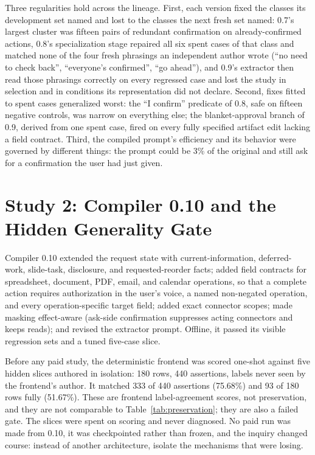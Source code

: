\documentclass[11pt]{article}
\begin{document}
Three regularities hold across the lineage. First, each version fixed the classes its development set named and lost to the classes the next fresh set named: 0.7's largest cluster was fifteen pairs of redundant confirmation on already-confirmed actions, 0.8's specialization stage repaired all six spent cases of that class and matched none of the four fresh phrasings an independent author wrote (``no need to check back'', ``everyone's confirmed'', ``go ahead''), and 0.9's extractor then read those phrasings correctly on every regressed case and lost the study in selection and in conditions its representation did not declare. Second, fixes fitted to spent cases generalized worst: the ``I confirm'' predicate of 0.8, safe on fifteen negative controls, was narrow on everything else; the blanket-approval branch of 0.9, derived from one spent case, fired on every fully specified artifact edit lacking a field contract. Third, the compiled prompt's efficiency and its behavior were governed by different things: the prompt could be 3\% of the original and still ask for a confirmation the user had just given.

\section{Study 2: Compiler 0.10 and the Hidden Generality Gate}
\label{sec:c010}

Compiler 0.10 extended the request state with current-information, deferred-work, slide-task, disclosure, and requested-reorder facts; added field contracts for spreadsheet, document, PDF, email, and calendar operations, so that a complete action requires authorization in the user's voice, a named non-negated operation, and every operation-specific target field; added exact connector scopes; made masking effect-aware (ask-side confirmation suppresses acting connectors and keeps reads); and revised the extractor prompt. Offline, it passed its visible regression sets and a tuned five-case slice.

Before any paid study, the deterministic frontend was scored one-shot against five hidden slices authored in isolation: 180 rows, 440 assertions, labels never seen by the frontend's author. It matched 333 of 440 assertions (75.68\%) and 93 of 180 rows fully (51.67\%). These are frontend label-agreement scores, not preservation, and they are not comparable to Table~\ref{tab:preservation}; they are also a failed gate. The slices were spent on scoring and never diagnosed. No paid run was made from 0.10, it was checkpointed rather than frozen, and the inquiry changed course: instead of another architecture, isolate the mechanisms that were losing.
\end{document}

